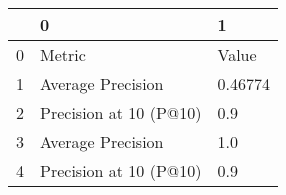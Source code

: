 \begin{tabular}{lll}
\toprule
{} &                       0 &        1 \\
\midrule
0 &                  Metric &    Value \\
1 &       Average Precision &  0.46774 \\
2 &  Precision at 10 (P@10) &      0.9 \\
3 &       Average Precision &      1.0 \\
4 &  Precision at 10 (P@10) &      0.9 \\
\bottomrule
\end{tabular}
